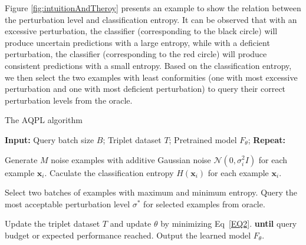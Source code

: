 \documentclass[letterpaper]{article} %
\begin{document}
Figure \ref{fig:intuitionAndTheroy} presents an example to show the relation between the perturbation level and classification entropy. It can be observed that with an excessive perturbation, the classifier (corresponding to the black circle) will produce uncertain predictions with a large entropy, while with a deficient perturbation, the classifier (corresponding to the red circle) will produce consistent predictions with a small entropy. Based on the classification entropy, we then select the two examples with least conformities (one with most excessive perturbation and one with most deficient perturbation) to query their correct perturbation levels from the oracle.

\begin{algorithm}[t]
	
	\caption{The AQPL algorithm}
	\label{alg:AQPL}
	\begin{algorithmic}[1]
		\STATE \textbf{Input:}
		\STATE \quad Query batch size $B$;
		\STATE \quad Triplet dataset $T$;
		\STATE \quad Pretrained model $F_\theta$;
		\STATE \textbf{Repeat:}
		
		\STATE \quad Generate $M$ noise examples with additive Gaussian noise $\mathcal{N}(0,\sigma_i^2 I)$ for each example $\mathbf{x}_i$.
		\STATE \quad Caculate the classification entropy $H(\mathbf{x}_i)$ for each example $\mathbf{x}_i$.  
		
		\STATE \quad Select two batches of examples with maximum and minimum entropy.
		\STATE \quad Query the most acceptable perturbation level $\sigma^*$ for selected examples from oracle.
		
		
		\STATE \quad Update the triplet dataset $T$ and update $\theta$ by minimizing Eq~\ref{EQ2}.
		\STATE \textbf{until} query budget or expected performance reached.
		\STATE Output the learned model $F_\theta$.
		
	\end{algorithmic}
\end{algorithm}
\end{document}
